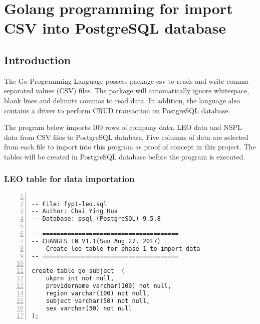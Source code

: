 \chapter{Golang programming for import CSV into PostgreSQL database} 
\label{AppendixC} 


\section{Introduction}

The Go Programming Language possess package csv to reads and write comma-separated values (CSV) files. The package will automatically ignore whitespace, blank lines and delimits commas to read data. In addition, the language also contains a driver to perform CRUD transaction on PostgreSQL database. 

The program below imports 100 rows of company data, LEO data and NSPL data from CSV files to PostgreSQL database. Five columns of data are selected from each file to import into this program as proof of concept in this project. The tables will be created in PostgreSQL database before the program is executed.

\pagebreak

\subsection {LEO table for data importation}

\lstset{basicstyle=\ttfamily\tiny} 
\begin{lstlisting}[breaklines, frame=single, numbers=left, caption={PostgreSQL query for LEO table creation.}, label=commandline-02]

-- File: fyp1-leo.sql
-- Author: Chai Ying Hua 
-- Database: psql (PostgreSQL) 9.5.8

-- ======================================
-- CHANGES IN V1.1(Sun Aug 27. 2017)
-- 	Create leo table for phase 1 to import data
-- ======================================

create table go_subject  ( 
	ukprn int not null, 
	providername varchar(100) not null,
	region varchar(100) not null, 
	subject varchar(50) not null, 
	sex varchar(30) not null
);

\end{lstlisting}


